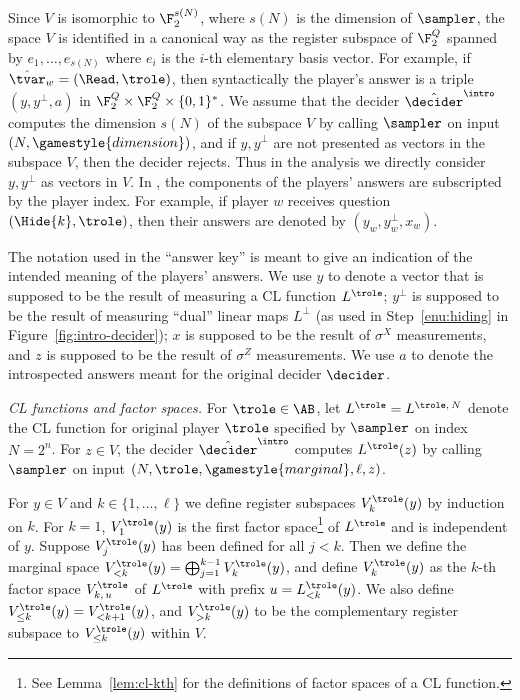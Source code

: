 Since $V$ is isomorphic to $\F_2^{s(N)}$, where $s(N)$ is the dimension of
$\sampler$, the space $V$ is identified in a canonical way as the register
subspace of $\F_2^Q$ spanned by $e_1,\ldots,e_{s(N)}$ where $e_i$ is the $i$-th
elementary basis vector.
For example, if $\hat{\tvar}_w = (\Read,\trole)$, then syntactically the
player's answer is a triple $(y,y^\perp,a)$ in $\F_2^Q \times \F_2^Q
\times \{0,1\}^*$.
We assume that the decider $\hat{\decider}^\intro$ computes the dimension $s(N)$ of the
subspace $V$ by calling $\sampler$ on input $(N,\gamestyle{dimension})$, and
 if $y,y^\perp$ are not presented as vectors in the subspace $V$,
then the decider rejects. Thus in the analysis we directly consider $y,y^\perp$ as vectors in $V$.
In , the components of the players' answers are
subscripted by the player index.
For example, if player $w$ receives question $(\Hide{k},\trole)$, then their
answers are denoted by $(y_w,y_w^\perp,x_w)$.

The notation used in the ``answer key'' is meant to give an indication of the
intended meaning of the players' answers.
We use $y$ to denote a vector that is supposed to be the result of measuring a
CL function $L^\trole$; $y^\perp$ is supposed to be the result of measuring
``dual'' linear maps $L^\perp$ (as used in Step~\ref{enu:hiding} in
Figure~\ref{fig:intro-decider}); $x$ is supposed to be the result of $\sigma^X$
measurements, and $z$ is supposed to be the result of $\sigma^Z$ measurements.
We use $a$ to denote the introspected answers meant for the original decider
$\decider$.

\medskip
\emph{CL functions and factor spaces.}
For $\trole \in \AB$, let $L^\trole = L^{\trole,\, N}$ denote the CL function
for original player $\trole$ specified by $\sampler$ on index $N = 2^n$.
For $z \in V$, the decider $\hat{\decider}^\intro$ computes $L^\trole(z)$ by calling
$\sampler$ on input $(N, \trole, \gamestyle{marginal}, \ell, z)$.

For $y \in V$ and $k \in \{1,\ldots,\ell\}$ we define register subspaces
$V_{k}^\trole (y)$ by induction on $k$.
For $k=1$, $V_1^\trole(y)$ is the first factor space\footnote{See
  Lemma~\ref{lem:cl-kth} for the definitions of factor spaces of a CL function.}
of $L^\trole$ and is independent of $y$.
Suppose $V_j^\trole(y)$ has been defined for all $j < k$.
Then we define the marginal space $V_{< k}^\trole(y) = \bigoplus_{j=1}^{k-1}
V_k^\trole(y)$, and define $V_k^\trole(y)$ as the $k$-th factor space $V_{k,\,
  u}^\trole$ of $L^\trole$ with prefix $u = L_{<k}^\trole(y)$.
We also define $V^\trole_{\leq k}(y) = V^\trole_{< k+1}(y)$, and $V^\trole_{>
  k}(y)$ to be the complementary register subspace to $V^\trole_{\leq k}(y)$
within $V$.


